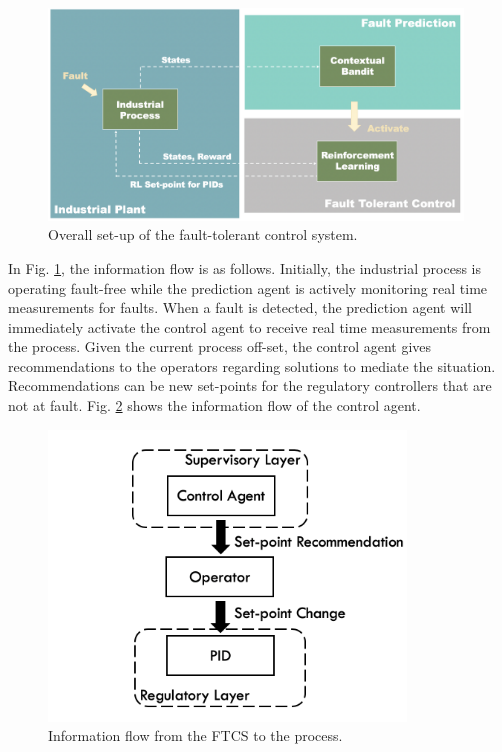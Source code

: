 \begin{figure}[H]
    \begin{center}
        \includegraphics[width=11cm]{images/ftc/FTC_Setup.png}
        \caption{\label{fig:ftc_setup} Overall set-up of the fault-tolerant control system.}
    \end{center}
\end{figure}
In Fig. \ref{fig:ftc_setup}, the information flow is as follows.  Initially, the industrial process is operating fault-free while the prediction agent is actively monitoring real time measurements for faults.  When a fault is detected, the prediction agent will immediately activate the control agent to receive real time measurements from the process.  Given the current process off-set, the control agent gives recommendations to the operators regarding solutions to mediate the situation.  Recommendations can be new set-points for the regulatory controllers that are not at fault.
Fig. \ref{fig:ftc_pid_setup} shows the information flow of the control agent. 
\begin{figure}[H]
    \begin{center}
        \includegraphics[width=9.5cm]{images/ftc/ftc_pid_setup.png}
        \caption{\label{fig:ftc_pid_setup} Information flow from the FTCS to the process.}
    \end{center}
\end{figure}
